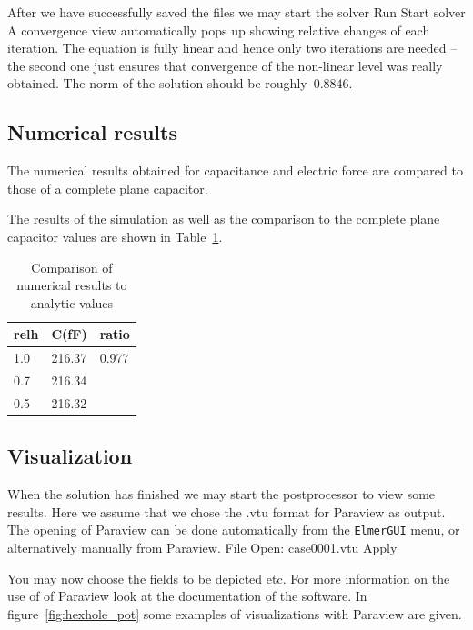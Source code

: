 After we have successfully saved the files we may start the solver
\ttbegin
Run
  Start solver
\ttend
A convergence view automatically pops up showing relative changes of each iteration.
The equation is fully linear and hence only two iterations are needed -- the second 
one just ensures that convergence of the non-linear level was really obtained. 
The norm of the solution should be roughly~0.8846.


\subsection*{Numerical results}

The numerical results obtained for capacitance and electric force are compared
to those of a complete plane capacitor. 

The results of the simulation as well as the comparison to the
complete plane capacitor values are shown in Table~\ref{tab_elstatics}. 

\begin{table}[htb]
\caption{Comparison of numerical results to analytic values}
\label{tab_elstatics}
\begin{center}
\begin{tabular}{lll} \hline
relh & C(fF) & ratio \\ \hline
1.0  & 216.37    & 0.977       \\
0.7  & 216.34    &        \\
0.5  & 216.32    &        \\ \hline
\end{tabular}
\end{center}
\end{table}



\subsection*{Visualization}

When the solution has finished we may start the postprocessor to view some results.
Here we assume that we chose the .vtu format for Paraview as output. The opening of Paraview can be done automatically from the \texttt{ElmerGUI} menu, or alternatively manually from Paraview.
\ttbegin
File 
  Open: case0001.vtu
  Apply 
\ttend

You may now choose the fields to be depicted etc. For more information on the use of of Paraview look at 
the documentation of the software. In figure~\ref{fig:hexhole_pot} some examples of visualizations with Paraview are given. 


